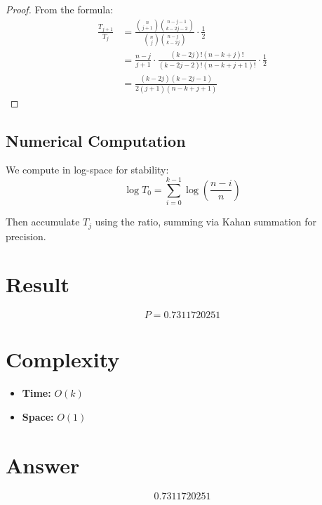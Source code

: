 \documentclass[12pt]{article}
\begin{document}
\begin{proof}
    From the formula:
    \begin{align}
        \frac{T_{j+1}}{T_j} &= \frac{\binom{n}{j+1}\binom{n-j-1}{k-2j-2}}{\binom{n}{j}\binom{n-j}{k-2j}} \cdot \frac{1}{2} \\
        &= \frac{n-j}{j+1} \cdot \frac{(k-2j)!(n-k+j)!}{(k-2j-2)!(n-k+j+1)!} \cdot \frac{1}{2} \\
        &= \frac{(k-2j)(k-2j-1)}{2(j+1)(n-k+j+1)}
    \end{align}
\end{proof}

\subsection{Numerical Computation}
We compute in log-space for stability:
\begin{equation}
    \log T_0 = \sum_{i=0}^{k-1} \log\left(\frac{n-i}{n}\right)
\end{equation}

Then accumulate $T_j$ using the ratio, summing via Kahan summation for precision.

\section{Result}
\begin{equation}
    P = \boxed{0.7311720251}
\end{equation}

\section{Complexity}
\begin{itemize}
    \item \textbf{Time:} $O(k)$
    \item \textbf{Space:} $O(1)$
\end{itemize}

\section{Answer}

\[
\boxed{0.7311720251}
\]
\end{document}
